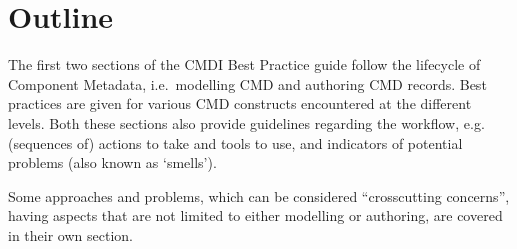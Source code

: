 \section{Outline}\label{outline}

The first two sections of the CMDI Best Practice guide follow the
lifecycle of Component Metadata, i.e.~modelling CMD and authoring CMD records. Best practices are given for various CMD constructs encountered at the different levels. Both these sections also provide guidelines regarding the workflow, e.g. (sequences of) actions to take and tools to use, and indicators of potential problems (also known as `smells').

\begin{workinprogress}

Some approaches and problems, which can be considered ``crosscutting concerns'', having aspects that are not limited to either modelling or authoring, are covered in their own section.

\end{workinprogress}
